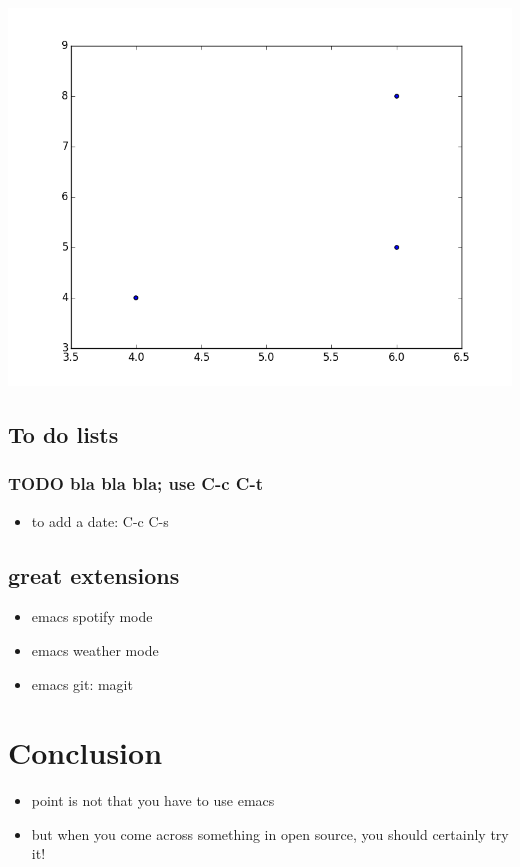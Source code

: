 \documentclass[11pt]{article}
\begin{document}
\begin{center}
\includegraphics[width=.9\linewidth]{./table.png}
\end{center}

\subsection*{To do lists}
\label{sec:org7c5a1fa}

\subsubsection*{{\bfseries\sffamily TODO} bla bla bla; use C-c C-t}
\label{sec:org044fe3e}

\begin{itemize}
\item to add a date: C-c C-s
\end{itemize}

\subsection*{great extensions}
\label{sec:org2b769ec}
\begin{itemize}
\item emacs spotify mode
\item emacs weather mode
\item emacs git: magit
\end{itemize}
\section*{Conclusion}
\label{sec:orgdc8da81}

\begin{itemize}
\item point is not that you have to use emacs
\item but when you come across something in open source, you should certainly try it!
\end{itemize}
\end{document}
